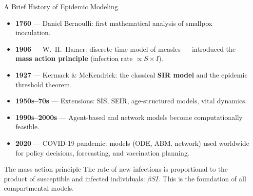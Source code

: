 \begin{frame}{A Brief History of Epidemic Modeling}
  \footnotesize
  \begin{itemize}
    \item \textbf{1760} --- Daniel Bernoulli: first mathematical analysis of smallpox inoculation.
    \item \textbf{1906} --- W.\ H.\ Hamer: discrete-time model of measles --- introduced the \textbf{mass action principle} (infection rate $\propto S \times I$).
    \item \textbf{1927} --- Kermack \& McKendrick: the classical \textbf{SIR model} and the epidemic threshold theorem.
    \item \textbf{1950s--70s} --- Extensions: SIS, SEIR, age-structured models, vital dynamics.
    \item \textbf{1990s--2000s} --- Agent-based and network models become computationally feasible.
    \item \textbf{2020} --- COVID-19 pandemic: models (ODE, ABM, network) used worldwide for policy decisions, forecasting, and vaccination planning.
  \end{itemize}
  \vfill
  \pause
    \footnotesize
  \begin{block}{The mass action principle}
    The rate of new infections is proportional to the product of susceptible and infected individuals: $\beta S I$. This is the foundation of all compartmental models.
  \end{block}
\end{frame}




